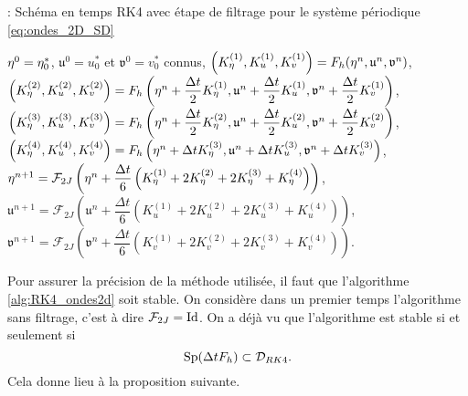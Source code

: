 \begin{center}
\begin{minipage}[H]{12cm}
  \begin{algorithm}[H]
    \caption{: Schéma en temps RK4 avec étape de filtrage pour le système périodique \eqref{eq:ondes_2D_SD}}\label{alg:RK4_ondes2d}
    \begin{algorithmic}[1]
    \State $\mathbf{\eta}^0 = \eta_0^*$, $\mathfrak{u}^0 = u_0^*$ et $\mathfrak{v}^0 = v_0^*$ connus,
             \State  $\left(K^{(1)}_{\eta}, K^{(1)}_{u}, K^{(1)}_{v}\right) = F_h(\mathbf{\eta}^n, \mathfrak{u}^n, \mathfrak{v}^n)$,
             \State  $\left(K^{(2)}_{\eta}, K^{(2)}_{u}, K^{(2)}_{v}\right) = F_h\left(\mathbf{\eta}^n + \dfrac{\Delta t}{2}K^{(1)}_{\eta}, \mathfrak{u}^n + \dfrac{\Delta t}{2}K^{(1)}_{u}, \mathfrak{v}^n + \dfrac{\Delta t}{2}K^{(1)}_{v}\right)$,
             \State   $\left(K^{(3)}_{\eta}, K^{(3)}_{u}, K^{(3)}_{v}\right) = F_h\left(\mathbf{\eta}^n + \dfrac{\Delta t}{2}K^{(2)}_{\eta}, \mathfrak{u}^n + \dfrac{\Delta t}{2}K^{(2)}_{u}, \mathfrak{v}^n + \dfrac{\Delta t}{2}K^{(2)}_{v}\right)$,
             \State   $\left(K^{(4)}_{\eta}, K^{(4)}_{u}, K^{(4)}_{v}\right) = F_h\left(\mathbf{\eta}^n + \Delta t K^{(3)}_{\eta}, \mathfrak{u}^n + \Delta tK^{(3)}_{u}, \mathfrak{v}^n + \Delta t K^{(3)}_{v}\right)$,
             \State  $\mathbf{\eta}^{n+1} = \mathcal{F}_{2J}\left( \mathbf{\eta}^n  + \dfrac{\Delta t}{6} \left( K^{(1)}_{\eta} + 2 K^{(2)}_{\eta} + 2 K^{(3)}_{\eta} + K^{(4)}_{\eta} \right) \right)$,
             \State  $\mathfrak{u}^{n+1} = \mathcal{F}_{2J}\left( \mathfrak{u}^n  + \dfrac{\Delta t}{6} \left( K^{(1)}_{u} + 2 K^{(2)}_{u} + 2 K^{(3)}_{u} + K^{(4)}_{u} \right) \right)$,
             \State  $\mathfrak{v}^{n+1} = \mathcal{F}_{2J}\left( \mathfrak{v}^n  + \dfrac{\Delta t}{6} \left( K^{(1)}_{v} + 2 K^{(2)}_{v} + 2 K^{(3)}_{v} + K^{(4)}_{v} \right) \right)$.
            \EndFor
    \end{algorithmic}
    \end{algorithm}
\end{minipage}
\end{center}











Pour assurer la précision de la méthode utilisée, il faut que l'algorithme \eqref{alg:RK4_ondes2d} soit stable. On considère dans un premier temps l'algorithme sans filtrage, c'est à dire $\mathcal{F}_{2J}=\text{Id}$. On a déjà vu que l'algorithme est stable si et seulement si
\begin{equation}
\text{Sp} ( \Delta t F_h ) \subset \mathcal{D}_{RK4}.
\end{equation}
Cela donne lieu à la proposition suivante.


